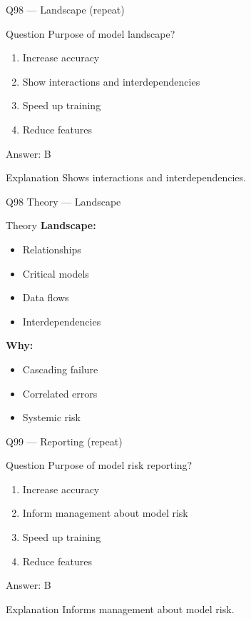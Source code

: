 \documentclass[aspectratio=169,8pt]{beamer}
\begin{document}
	\begin{frame}{Q98 --- Landscape (repeat)}
		\begin{block}{Question}
			Purpose of model landscape?
		\end{block}
		\begin{enumerate}[label=\Alph*.]
			\item Increase accuracy
			\item Show interactions and interdependencies
			\item Speed up training
			\item Reduce features
		\end{enumerate}
		\begin{exampleblock}{Answer: B}
		\end{exampleblock}
		\begin{block}{Explanation}
			Shows interactions and interdependencies.
		\end{block}
	\end{frame}
	
	\begin{frame}{Q98 Theory --- Landscape}
		\begin{block}{Theory}
			\textbf{Landscape:}
			\begin{itemize}
				\item Relationships
				\item Critical models
				\item Data flows
				\item Interdependencies
			\end{itemize}
			\textbf{Why:}
			\begin{itemize}
				\item Cascading failure
				\item Correlated errors
				\item Systemic risk
			\end{itemize}
		\end{block}
	\end{frame}
	
	\begin{frame}{Q99 --- Reporting (repeat)}
		\begin{block}{Question}
			Purpose of model risk reporting?
		\end{block}
		\begin{enumerate}[label=\Alph*.]
			\item Increase accuracy
			\item Inform management about model risk
			\item Speed up training
			\item Reduce features
		\end{enumerate}
		\begin{exampleblock}{Answer: B}
		\end{exampleblock}
		\begin{block}{Explanation}
			Informs management about model risk.
		\end{block}
	\end{frame}
	
\end{document}
